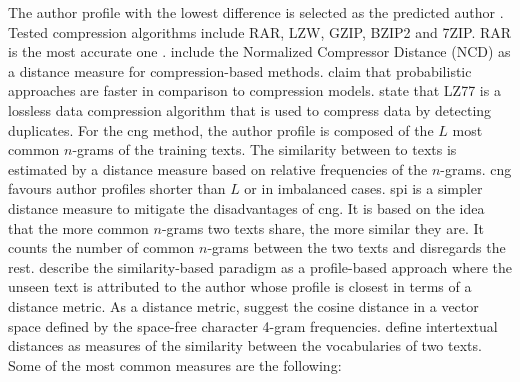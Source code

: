The author profile with the lowest difference is selected as the predicted author \cite{stamatatos_survey_2009,elmanarelbouanani_authorship_2014}.
Tested compression algorithms include RAR, LZW, GZIP, BZIP2 and 7ZIP. 
RAR is the most accurate one \cite{elmanarelbouanani_authorship_2014}.
\citet{elmanarelbouanani_authorship_2014} include the Normalized Compressor Distance (NCD) as a distance measure for compression-based methods. %
\citet{stamatatos_survey_2009} claim that probabilistic approaches are faster in comparison to compression models.
\citet{neal_surveying_2018} state that LZ77 is a lossless data compression algorithm that is used to compress data by detecting duplicates.
For the \ac{cng} method, the author profile is composed of the $L$ most common $n$-grams of the training texts.
The similarity between to texts is estimated by a distance measure based on relative frequencies of the $n$-grams.
\ac{cng} favours author profiles shorter than $L$ or in imbalanced cases.
\ac{spi} is a simpler distance measure to mitigate the disadvantages of \ac{cng}.
It is based on the idea that the more common $n$-grams two texts share, the more similar they are.
It counts the number of common $n$-grams between the two texts and disregards the rest.
\cite{koppel_authorship_2011} describe the similarity-based paradigm as a profile-based approach 
where the unseen text is attributed to the author whose profile is closest in terms of a distance metric.
As a distance metric, \citet{koppel_authorship_2011} suggest the cosine distance in a vector space 
defined by the space-free character 4-gram frequencies.
\citet{neal_surveying_2018} define intertextual distances as measures of the similarity between the vocabularies of two texts.
Some of the most common measures are the following:
